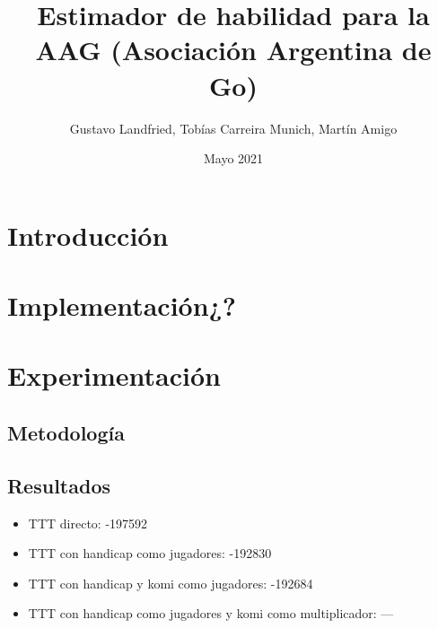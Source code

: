 \documentclass{article}
\title{Estimador de habilidad para la AAG (Asociación Argentina de Go)}
\author{Gustavo Landfried, Tobías Carreira Munich, Martín Amigo}
\date{Mayo 2021}
\begin{document}
\maketitle

\section{Introducción}

\section{Implementación¿?}


\section{Experimentación}

\subsection{Metodología}


\subsection{Resultados}
\begin{itemize}
    \item TTT directo: -197592
    \item TTT con handicap como jugadores: -192830
    \item TTT con handicap y komi como jugadores: -192684
    \item TTT con handicap como jugadores y komi como multiplicador: ---

\end{itemize}
\end{document}
